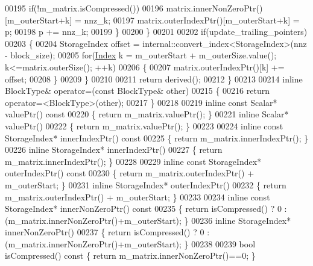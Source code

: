 \begin{DoxyCode}
00195           \textcolor{keywordflow}{if}(!m\_matrix.isCompressed())
00196             matrix.innerNonZeroPtr()[m\_outerStart+k] = nnz\_k;
00197           matrix.outerIndexPtr()[m\_outerStart+k] = p;
00198           p += nnz\_k;
00199         \}
00200       \}
00201 
00202       \textcolor{keywordflow}{if}(update\_trailing\_pointers)
00203       \{
00204         StorageIndex offset = internal::convert\_index<StorageIndex>(nnz - block\_size);
00205         \textcolor{keywordflow}{for}(\hyperlink{namespace_eigen_a62e77e0933482dafde8fe197d9a2cfde}{Index} k = m\_outerStart + m\_outerSize.value(); k<=matrix.outerSize(); ++k)
00206         \{
00207           matrix.outerIndexPtr()[k] += offset;
00208         \}
00209       \}
00210 
00211       \textcolor{keywordflow}{return} derived();
00212     \}
00213 
00214     \textcolor{keyword}{inline} BlockType& operator=(\textcolor{keyword}{const} BlockType& other)
00215     \{
00216       \textcolor{keywordflow}{return} \textcolor{keyword}{operator}=<BlockType>(other);
00217     \}
00218 
00219     \textcolor{keyword}{inline} \textcolor{keyword}{const} Scalar* valuePtr()\textcolor{keyword}{ const}
00220 \textcolor{keyword}{    }\{ \textcolor{keywordflow}{return} m\_matrix.valuePtr(); \}
00221     \textcolor{keyword}{inline} Scalar* valuePtr()
00222     \{ \textcolor{keywordflow}{return} m\_matrix.valuePtr(); \}
00223 
00224     \textcolor{keyword}{inline} \textcolor{keyword}{const} StorageIndex* innerIndexPtr()\textcolor{keyword}{ const}
00225 \textcolor{keyword}{    }\{ \textcolor{keywordflow}{return} m\_matrix.innerIndexPtr(); \}
00226     \textcolor{keyword}{inline} StorageIndex* innerIndexPtr()
00227     \{ \textcolor{keywordflow}{return} m\_matrix.innerIndexPtr(); \}
00228 
00229     \textcolor{keyword}{inline} \textcolor{keyword}{const} StorageIndex* outerIndexPtr()\textcolor{keyword}{ const}
00230 \textcolor{keyword}{    }\{ \textcolor{keywordflow}{return} m\_matrix.outerIndexPtr() + m\_outerStart; \}
00231     \textcolor{keyword}{inline} StorageIndex* outerIndexPtr()
00232     \{ \textcolor{keywordflow}{return} m\_matrix.outerIndexPtr() + m\_outerStart; \}
00233 
00234     \textcolor{keyword}{inline} \textcolor{keyword}{const} StorageIndex* innerNonZeroPtr()\textcolor{keyword}{ const}
00235 \textcolor{keyword}{    }\{ \textcolor{keywordflow}{return} isCompressed() ? 0 : (m\_matrix.innerNonZeroPtr()+m\_outerStart); \}
00236     \textcolor{keyword}{inline} StorageIndex* innerNonZeroPtr()
00237     \{ \textcolor{keywordflow}{return} isCompressed() ? 0 : (m\_matrix.innerNonZeroPtr()+m\_outerStart); \}
00238 
00239     \textcolor{keywordtype}{bool} isCompressed()\textcolor{keyword}{ const }\{ \textcolor{keywordflow}{return} m\_matrix.innerNonZeroPtr()==0; \}

\end{DoxyCode}
